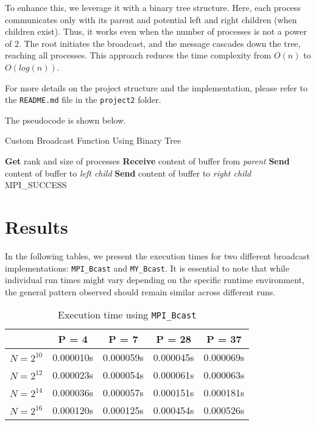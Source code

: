 \documentclass[12pt,a4paper]{article}
\begin{document}
To enhance this, 
we leverage it with a binary tree structure. 
Here, each process communicates only with its parent and potential left and right children (when children exist). 
Thus, it works even when the number of processes is not a power of 2.
The root initiates the broadcast, and the message cascades down the tree, reaching all processes.
This approach reduces the time complexity from $O(n)$ to $O(log(n))$.

For more details on the project structure and the implementation, 
please refer to the \texttt{README.md} file in the \texttt{project2} folder.

The pseudocode is shown below.
\begin{algorithm}
    \caption{Custom Broadcast Function Using Binary Tree}
    \begin{algorithmic}[1]
    \State \textbf{Get} rank and size of processes
            \State \textbf{Receive} content of buffer from \textit{parent} 
        \EndIf
            \State \textbf{Send} content of buffer to \textit{left child} 
        \EndIf
            \State \textbf{Send} content of buffer to \textit{right child} 
        \EndIf
        \State \Return MPI\_SUCCESS
    \EndProcedure
    \end{algorithmic}
\end{algorithm}


\section{Results}

In the following tables, 
we present the execution times for two different broadcast implementations: 
\texttt{MPI\_Bcast} and \texttt{MY\_Bcast}. 
It is essential to note that while individual run times might vary depending on the specific runtime environment, 
the general pattern observed should remain similar across different runs.

\begin{table}[!htb]
    \centering
    \begin{tabular}{|c|c|c|c|c|}
    \hline
    & P = 4 & P = 7 & P = 28 & P = 37 \\
    \hline
    $N = 2^{10}$ & 0.000010s & 0.000059s & 0.000045s & 0.000069s \\
    \hline
    $N = 2^{12}$ & 0.000023s & 0.000054s & 0.000061s & 0.000063s \\
    \hline
    $N = 2^{14}$ & 0.000036s & 0.000057s & 0.000151s & 0.000181s \\
    \hline
    $N = 2^{16}$ & 0.000120s & 0.000125s & 0.000454s & 0.000526s \\
    \hline
    \end{tabular}
    \caption{Execution time using \texttt{MPI\_Bcast}}
    \end{table}
\end{document}
